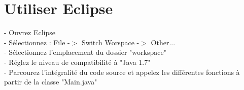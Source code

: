 \documentclass[12pt,a4paper,titlepage]{article}
\begin{document}
\section{Utiliser Eclipse}
- Ouvrez Eclipse\\
- Sélectionnez : File -$>$ Switch Worspace -$>$ Other...\\
- Sélectionnez l'emplacement du dossier "workspace"\\
- Réglez le niveau de compatibilité à "Java 1.7"\\
- Parcourez l'intégralité du code source et appelez les différentes fonctions à partir de la classe "Main.java"
\end{document}

